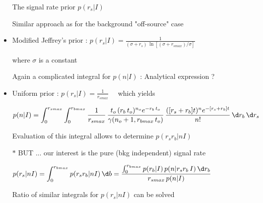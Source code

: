 \Tr
\begin{itemize}
\item[] \begin{center}{\blue The signal rate prior $p(r_{s}|I)$}\end{center}
\item[] Similar approach as for the background "off-source" case
\item Modified Jeffrey's prior : 
        {\blue $\displaystyle p(r_{s}|I)=\frac{1}{(\sigma+r_{s})\,\ln\left[(\sigma+r_{smax})/\sigma\right]}$}
\item[] where $\sigma$ is a constant
\item[] {\red Again a complicated integral for $p(n|I)$ : Analytical expression ?}
\item Uniform prior : {\blue $\displaystyle p(r_{s}|I)=\frac{1}{r_{smax}} \quad$} which yields
\item[] {\blue $\displaystyle p(n|I)=\int_{0}^{r_{smax}}\int_{0}^{r_{bmax}}
                       \frac{1}{r_{smax}}\,
                       \frac{t_{o}\,(r_{b}\,t_{o})^{n_{o}} e^{-r_{b}\,t_{o}}}{\gamma(n_{o}+1,r_{bmax}\,t_{o})}\,
                       \frac{([r_{s}+r_{b}] t)^{n} e^{-[r_{s}+r_{b}] t}}{n!}
                       \,\d r_{b}\,\d r_{s}$}
\item[] Evaluation of this integral allows to determine $p(r_{s}r_{b}|nI)$
\item[$\ast$] {\red BUT ... our interest is the pure (bkg independent) signal rate}
\item[] \begin{center}
        {\blue $\displaystyle p(r_{s}|nI)=\int_{0}^{r_{bmax}} p(r_{s}r_{b}|nI)\,\d b
        =\frac{\int_{0}^{r_{bmax}} p(r_{b}|I)\,p(n|r_{s}r_{b}\,I)\,\d r_{b}}{r_{smax}\,p(n|I)}$}
        \end{center}
\item[] Ratio of similar integrals for $p(r_{s}|nI)$ can be solved
\end{itemize}

